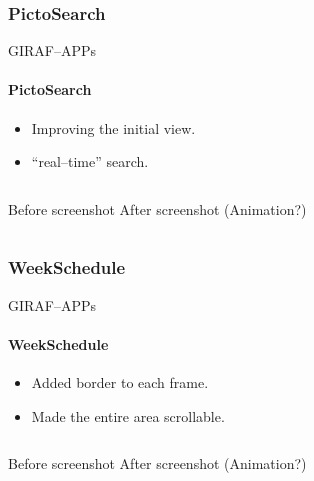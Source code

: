         \subsubsection{PictoSearch}
            \begin{frame}[t]{GIRAF--APPs}\framesubtitle{PictoSearch}
                \begin{itemize}
                    \item Improving the initial view.
                    \item ``real--time'' search.
                \end{itemize}
                \bigskip
                \begin{columns}[c]
                        Before screenshot
                        After screenshot (Animation?)
                \end{columns}
            \end{frame}

        \subsubsection{WeekSchedule}
            \begin{frame}[t]{GIRAF--APPs}\framesubtitle{WeekSchedule}
                \begin{itemize}
                    \item Added border to each frame.
                    \item Made the entire area scrollable.
                \end{itemize}
                \bigskip
                \begin{columns}[c]
                        Before screenshot
                        After screenshot (Animation?)
                \end{columns}
            \end{frame}
